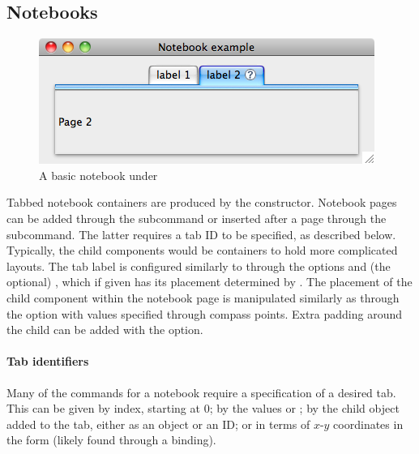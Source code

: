 \subsection{Notebooks}
\label{sec:tcltk:notebooks}


%
\begin{figure}
  \centering
  \includegraphics[width=.6\textwidth]{fig-tcltk-notebook}
 \caption{A basic notebook under \OSX{}}
  \label{fig:fig-notebook-example}
\end{figure}

Tabbed notebook containers are produced by the
 constructor.  Notebook pages can be added
through the  subcommand or inserted after
a page through the  subcommand. The
latter requires a tab ID to be specified, as described below.
Typically, the child components would be containers to hold more
complicated layouts. The tab label is configured similarly to
 through the options  and
(the optional) , which if given has its
placement determined by .  The placement
of the child component within the notebook page is manipulated
similarly as  through the
 option with values specified through
compass points. Extra padding around the child can be added with the
 option.

\paragraph{Tab identifiers} %
Many of the commands for a notebook require a specification of a
desired tab. This can be given by index, starting at 0; by the values
 or ; by the child object added to the
tab, either as an \R\/ object or an ID; or in terms of $x$-$y$
coordinates in the form  (likely found through a
binding).

